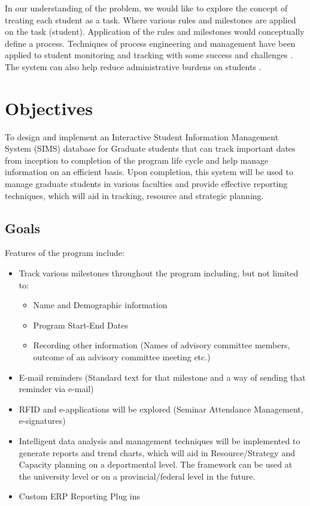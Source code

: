 \documentclass{journal}
\begin{document}
In our understanding of the problem, we would like to explore the concept of treating each student as a task. Where various rules and milestones are
applied on the task (student). Application of the rules and milestones would conceptually define a process. Techniques of process engineering and management 
have been applied to student monitoring and tracking with some success and challenges \cite{flex}.  The system can also help reduce administrative
burdens on students \cite{adv}.  

\section{Objectives}

To design and implement an Interactive Student Information Management System (SIMS) database for Graduate students that can track important dates from inception 
to completion of the program life cycle and help manage information on an efficient basis. Upon completion, this system will be used to manage graduate students 
in various faculties and provide effective reporting techniques, which will aid in tracking, resource and strategic planning.
\subsection{ Goals }
 Features of the program include:
\begin{itemize}
 \item{Track various milestones throughout the program including, but not limited to:}
 \begin{itemize}
   \item{ Name and Demographic information }
   \item{ Program Start-End Dates }
   \item{ Recording other information (Names of advisory committee members, outcome of an advisory committee meeting etc.) }
  \end{itemize}
  \item{ E-mail reminders (Standard text for that milestone and a way of sending that reminder via e-mail) }
  \item{ RFID and e-applications will be explored (Seminar Attendance Management, e-signatures) }
  \item{ Intelligent data analysis and management techniques will be implemented to generate reports and trend charts, which will aid in Resource/Strategy and Capacity planning on a departmental level. The framework can be used at the university level or on a provincial/federal level in the future. } 
  \item{ Custom ERP Reporting Plug ins }
\end{itemize}
\end{document}
